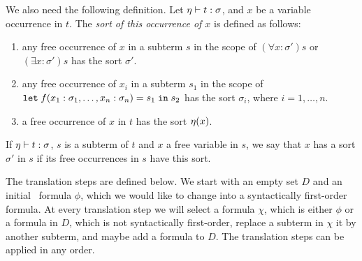 We also need the following definition. Let $\eta \vdash t:\sigma$, and $x$ be a variable occurrence in $t$. The \emph{sort of this occurrence of $x$} is defined as follows:

\begin{enumerate}
\item any free occurrence of $x$ in a subterm $s$ in the scope of $(\forall x:\sigma')s$ or $(\exists x:\sigma')s$ has the sort $\sigma'$.
\item any free occurrence of $x_i$ in a subterm $s_1$ in the scope of \\$\mathtt{let}\;{f(x_1:\sigma_1, \ldots, x_n:\sigma_n)}={s_1}\;\allowbreak\mathtt{in}\;{s_2}$ has the sort $\sigma_i$, where $i = 1,\ldots,n$. 
\item a free occurrence of $x$ in $t$ has the sort $\eta(x)$.
\end{enumerate}
If $\eta \vdash t:\sigma$, $s$ is a subterm of $t$ and $x$ a free variable in $s$, we say that $x$ has a sort $\sigma'$ in $s$ if its free occurrences in $s$ have this sort.

The translation steps are defined below. We start with an empty set $D$ and an initial \folb\ formula $\phi$, which we would like to change into a syntactically first-order formula. At every translation step we will select a formula $\chi$, which is either $\phi$ or a formula in $D$, which is not syntactically first-order, replace a subterm in $\chi$ it by another subterm, and maybe add a formula to $D$. The translation steps can be applied in any order.

